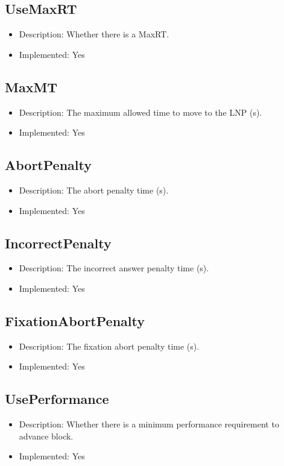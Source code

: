 \subsection*{UseMaxRT}
\begin{itemize}
	\item Description: Whether there is a MaxRT.
	\item Implemented: Yes
\end{itemize}

\subsection*{MaxMT}
\begin{itemize}
	\item Description: The maximum allowed time to move to the LNP (s).
	\item Implemented: Yes
\end{itemize}

\subsection*{AbortPenalty}
\begin{itemize}
	\item Description: The abort penalty time (s).
	\item Implemented: Yes
\end{itemize}

\subsection*{IncorrectPenalty}
\begin{itemize}
	\item Description: The incorrect answer penalty time (s).
	\item Implemented: Yes
\end{itemize}

\subsection*{FixationAbortPenalty}
\begin{itemize}
	\item Description: The fixation abort penalty time (s).
	\item Implemented: Yes
\end{itemize}

\subsection*{UsePerformance}
\begin{itemize}
	\item Description: Whether there is a minimum performance requirement to advance block.
	\item Implemented: Yes
\end{itemize}

